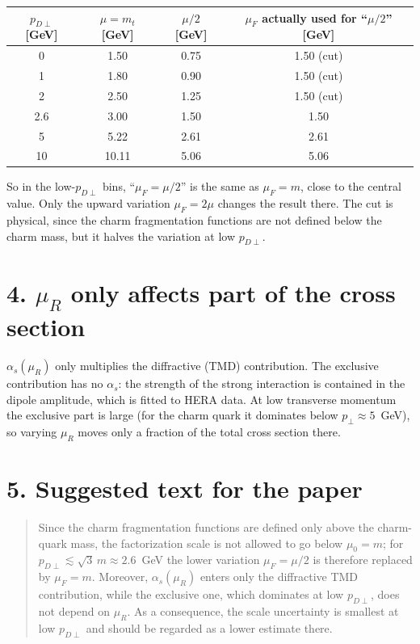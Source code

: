\documentclass[12pt]{article}
\begin{document}
\begin{center}
\begin{tabular}{cccc}
\toprule
$p_{D\perp}$ [GeV] & $\mu=m_t$ [GeV] & $\mu/2$ [GeV] & $\mu_F$ actually used for ``$\mu/2$'' [GeV] \\
\midrule
0   & 1.50 & 0.75 & 1.50 (cut) \\
1   & 1.80 & 0.90 & 1.50 (cut) \\
2   & 2.50 & 1.25 & 1.50 (cut) \\
2.6 & 3.00 & 1.50 & 1.50 \\
5   & 5.22 & 2.61 & 2.61 \\
10  & 10.11 & 5.06 & 5.06 \\
\bottomrule
\end{tabular}
\end{center}

So in the low-$p_{D\perp}$ bins, ``$\mu_F=\mu/2$'' is the same as $\mu_F=m$, close to the central
value. Only the upward variation $\mu_F=2\mu$ changes the result there. The cut is physical,
since the charm fragmentation functions are not defined below the charm mass, but it halves the
variation at low $p_{D\perp}$.

\section*{4. $\mu_R$ only affects part of the cross section}

$\alpha_s(\mu_R)$ only multiplies the diffractive (TMD) contribution. The exclusive contribution
has no $\alpha_s$: the strength of the strong interaction is contained in the dipole amplitude,
which is fitted to HERA data. At low transverse momentum the exclusive part is large (for the
charm quark it dominates below $p_\perp\approx5$~GeV), so varying $\mu_R$ moves only a fraction of
the total cross section there.

\section*{5. Suggested text for the paper}

\begin{quote}
Since the charm fragmentation functions are defined only above the charm-quark mass, the
factorization scale is not allowed to go below $\mu_0=m$; for $p_{D\perp}\lesssim\sqrt3\,m\approx
2.6$~GeV the lower variation $\mu_F=\mu/2$ is therefore replaced by $\mu_F=m$. Moreover,
$\alpha_s(\mu_R)$ enters only the diffractive TMD contribution, while the exclusive one, which
dominates at low $p_{D\perp}$, does not depend on $\mu_R$. As a consequence, the scale uncertainty
is smallest at low $p_{D\perp}$ and should be regarded as a lower estimate there.
\end{quote}
\end{document}
